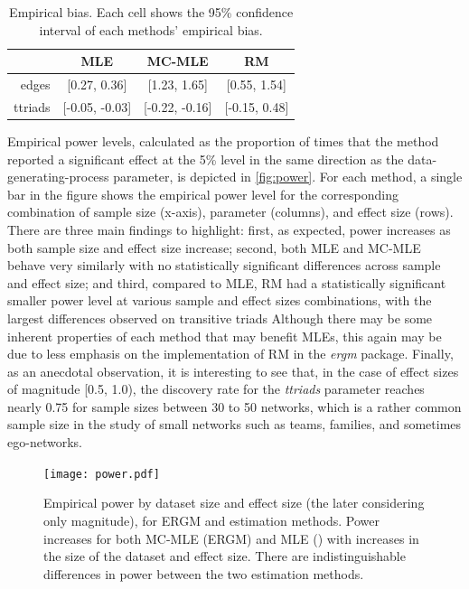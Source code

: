 \documentclass[review, nonatbib,doubleblind]{elsarticle/elsarticle}
\begin{document}
\begin{table}[ht]
\centering
\begin{tabular}{rccc}
  \toprule
 & MLE & MC-MLE & RM \\ 
  \midrule
edges & [0.27, 0.36] & [1.23, 1.65] & [0.55, 1.54] \\ 
  ttriads & [-0.05, -0.03] & [-0.22, -0.16] & [-0.15, 0.48] \\ 
   \bottomrule
\end{tabular}
\caption{\label{tab:empirical-bias-sim}Empirical bias. Each cell shows the 95\% confidence interval of each methods' empirical bias.} 
\end{table}
    
Empirical power levels, calculated as the proportion of times that the method reported a significant effect at the 5\% level in the same direction as the data-generating-process parameter, is depicted in \autoref{fig:power}. For each method, a single bar in the figure shows the empirical power level for the corresponding combination of sample size (x-axis), parameter (columns), and effect size (rows). There are three main findings to highlight: first, as expected, power increases as both sample size and effect size increase; second, both MLE and MC-MLE behave very similarly with no statistically significant differences across sample and effect size; and third, compared to MLE, RM had a statistically significant smaller power level at various sample and effect sizes combinations, with the largest differences observed on transitive triads Although there may be some inherent properties of each method that may benefit MLEs, this again may be due to less emphasis on the implementation of RM in the  \textit{ergm} package. Finally, as an anecdotal observation, it is interesting to see that, in the case of effect sizes of magnitude [0.5, 1.0), the discovery rate for the \textit{ttriads} parameter reaches nearly 0.75 for sample sizes between 30 to 50 networks, which is a rather common sample size in the study of small networks such as teams, families, and sometimes ego-networks. 

\begin{figure}[tb]
	\centering
	\caption{\label{fig:power}Empirical power by dataset size and effect size (the later considering only magnitude), for ERGM and \ergmito{} estimation methods. Power increases for both MC-MLE (ERGM) and MLE (\ergmito{}) with increases in the size of the dataset and effect size. There are indistinguishable differences in power between the two estimation methods.}
	\texttt{[image: power.pdf]}
\end{figure}
\end{document}
